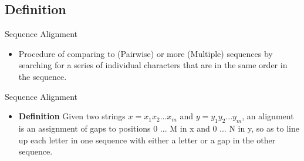 \documentclass{bredelebeamer}
\begin{document}
\subsection{Definition}
\begin{frame}{Sequence Alignment}
\begin{itemize}
    \item  Procedure of comparing to (Pairwise) or more (Multiple) sequences by searching for a series of individual characters that are in the same order in the sequence.
    \linebreak
    \linebreak
    \linebreak
\newline
\newline
\end{itemize}
\end{frame}
\begin{frame}{Sequence Alignment}
    \begin{itemize}
        \item \textbf{\large{Definition}}
        \linebreak
        Given two strings $x = x_1 x_2 ... x_m$ and $y = y_1 y_2 ... y_m$, \linebreak
        an alignment is an assignment of gaps to positions 0 ... M in x and 0 ... N in y, so as to line up each letter in one sequence with either a letter or a gap in the other sequence.
    \end{itemize}
\end{frame}
\end{document}
